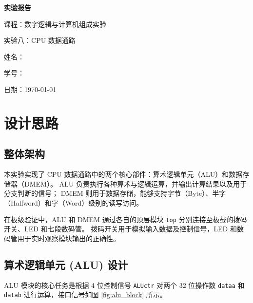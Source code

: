 \documentclass[12pt, a4paper]{ctexart}
\begin{document}
\begin{titlepage}
    \centering
    \vspace*{5cm}
    {\Huge\bfseries 实验报告\par}
    \vspace{2cm}
    {\Large 课程：数字逻辑与计算机组成实验\par}
    \vspace{1cm}
    {\Large 实验八：CPU 数据通路\par}
    \vspace{4cm}
    {\large 姓名：\underline{}\par}
    \vspace{1cm}
    {\large 学号：\underline{}\par}
    \vspace{1cm}
    {\large 日期：\today\par}
\end{titlepage}

\tableofcontents
\newpage
\section{设计思路}

\subsection{整体架构}

本实验实现了 CPU 数据通路中的两个核心部件：算术逻辑单元（ALU）和数据存储器（DMEM）。
ALU 负责执行各种算术与逻辑运算，并输出计算结果以及用于分支判断的信号；
DMEM 则用于数据存储，能够支持字节（Byte）、半字（Halfword）和字（Word）级别的读写访问。

在板级验证中，ALU 和 DMEM 通过各自的顶层模块 \texttt{top} 分别连接至板载的拨码开关、LED 和七段数码管。
拨码开关用于模拟输入数据及控制信号，LED 和数码管用于实时观察模块输出的正确性。

\subsection{算术逻辑单元 (ALU) 设计}

ALU 模块的核心任务是根据 4 位控制信号 \texttt{ALUctr} 对两个 32 位操作数
\texttt{dataa} 和 \texttt{datab} 进行运算，接口信号如图 \ref{fig:alu_block} 所示。
\end{document}
